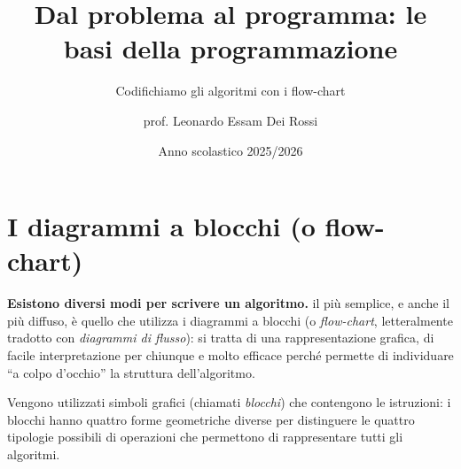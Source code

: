 \documentclass[
    notheorems,
    11pt,
    compress,
    aspectratio=169
]{beamer}
\title[Codifichiamo gli algoritmi con i flow-chart]{Dal problema al programma: le basi della programmazione}
\subtitle{Codifichiamo gli algoritmi con i flow-chart}
\author{prof. Leonardo Essam Dei Rossi}
\institute[]{ITT "M. Buonarroti" - Trento (TN)}
\date[A.S. 2025/2026]{Anno scolastico 2025/2026}
\begin{document}
\begin{frame}
    \titlepage
\end{frame}




\section{I diagrammi a blocchi (o flow-chart)}

\begin{frame}


    \textbf{Esistono diversi modi per scrivere un algoritmo.} il più semplice, e anche il più diffuso, è quello che utilizza i diagrammi a blocchi (o \textit{flow-chart}, letteralmente tradotto con \textit{diagrammi di flusso}): si tratta di una rappresentazione grafica, di facile interpretazione per chiunque e molto efficace perché permette di individuare “a colpo d’occhio” la struttura dell’algoritmo.

    \pause
    \vspace{\baselineskip}

    \begin{block}{}
        Vengono utilizzati simboli grafici (chiamati \textit{blocchi}) che contengono le istruzioni: i blocchi hanno quattro forme geometriche diverse per distinguere le quattro tipologie possibili di operazioni che permettono di rappresentare tutti gli algoritmi.
    \end{block}
\end{frame}
\end{document}
